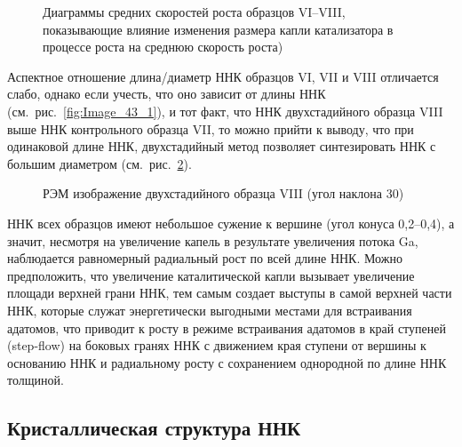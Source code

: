 \begin{figure}[ht]
	\caption{Диаграммы средних скоростей роста образцов VI--VIII, показывающие влияние изменения размера капли катализатора в процессе роста на среднюю скорость роста)}\label{fig:Image_44_2}
\end{figure}

Аспектное отношение длина/диаметр ННК образцов VI, VII и VIII отличается слабо, однако если учесть, что оно зависит от длины ННК (см.~рис.~\cref{fig:Image_43_1}), и тот факт, что ННК двухстадийного образца VIII выше ННК контрольного образца VII, то можно прийти к выводу, что при одинаковой длине ННК, двухстадийный метод позволяет синтезировать ННК с большим диаметром (см.~рис.~\cref{fig:Image_45}).

\begin{figure}[ht]
	\caption{РЭМ изображение двухстадийного образца VIII (угол наклона 30{\textdegree})}\label{fig:Image_45}
\end{figure}

ННК всех образцов имеют небольшое сужение к вершине (угол конуса 0,2--0,4{\textdegree}), а значит, несмотря на увеличение капель в результате увеличения потока Ga, наблюдается равномерный радиальный рост по всей длине ННК. Можно предположить, что увеличение каталитической капли вызывает увеличение площади верхней грани ННК, тем самым создает выступы в самой верхней части ННК, которые служат энергетически выгодными местами для встраивания адатомов, что приводит к росту в режиме встраивания адатомов в край ступеней (step-flow) на боковых гранях ННК с движением края ступени от вершины к основанию ННК и радиальному росту с сохранением однородной по длине ННК толщиной.

\subsection{Кристаллическая структура ННК}\label{subsec:ch6/sec2/sub6}

